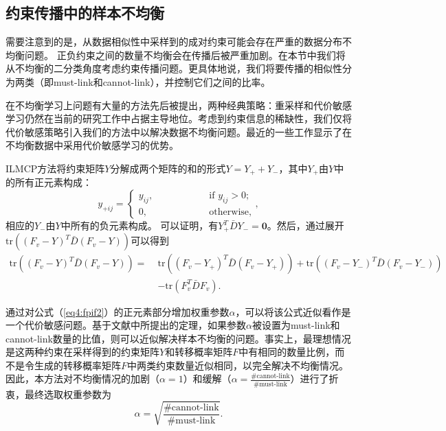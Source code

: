 \subsection{约束传播中的样本不均衡}
需要注意到的是，从数据相似性中采样到的成对约束可能会存在严重的数据分布不均衡问题。 正负约束之间的数量不均衡会在传播后被严重加剧。在本节中我们将从不均衡的二分类角度考虑约束传播问题。更具体地说，我们将要传播的相似性分为两类（即must-link和cannot-link），并控制它们之间的比率。

在不均衡学习上问题有大量的方法先后被提出，两种经典策略：重采样和代价敏感学习仍然在当前的研究工作中占据主导地位\cite{he2009learning,huang2016learning}。考虑到约束信息的稀缺性，我们仅将代价敏感策略引入我们的方法中以解决数据不均衡问题。最近的一些工作显示了在不均衡数据中采用代价敏感学习的优势\cite{shi2000normalized,DBLP:journals/corr/KhanBST15}。

ILMCP方法将约束矩阵$Y$分解成两个矩阵的和的形式${Y} = {Y}_++{Y}_-$，其中${Y}_+$由$Y$中的所有正元素构成：
\begin{equation}
{y}_{+ij} = 
\begin{cases}
y_{ij},\quad\qquad\qquad&\text{if }y_{ij}>0;\\ 0,&\text{otherwise,}
\end{cases},
\end{equation}
相应的${Y}_-$由$Y$中所有的负元素构成。
可以证明，有${Y}_+^T{\bar{{D}} Y}_- = \mathbf{0}$。然后，通过展开 $ \mathrm{tr}(({F}_v - {Y} )^T{\bar{D}}({F}_v - {Y})) $可以得到
\begin{equation}
\begin{split}
\mathrm{tr}((F_v - Y )^T\bar{D}(F_v - Y))=\;&\mathrm{tr}(({F}_v-{Y}_+)^T{\bar{D}}({F}_v-{Y}_+))+\mathrm{tr}(({F}_v-{Y}_-)^T{\bar{D}}({F}_v-{Y}_-))\\
&-\mathrm{tr}({F}_v^T{\bar{D} F}_v). 
\end{split}
\label{eq4:fpif2}
\end{equation}

通过对公式（\ref{eq4:fpif2}）的正元素部分增加权重参数$\alpha$，可以将该公式近似看作是一个代价敏感问题。基于文献\parencite{elkan2001foundations}中所提出的定理，如果参数$\alpha$被设置为must-link和cannot-link数量的比值，则可以近似解决样本不均衡的问题。事实上，最理想情况是这两种约束在采样得到的约束矩阵$Y$和转移概率矩阵$F$中有相同的数量比例，而不是令生成的转移概率矩阵$F$中两类约束数量近似相同，以完全解决不均衡情况。因此，本方法对不均衡情况的加剧（$\alpha=1$）和缓解（$\alpha= \frac{\#\text{cannot-link}}{\#\text{must-link}}$）进行了折衷，最终选取权重参数为
\begin{equation}
    \alpha = \sqrt{\frac{\#\text{cannot-link}}{\#\text{must-link}}}.
\end{equation}


